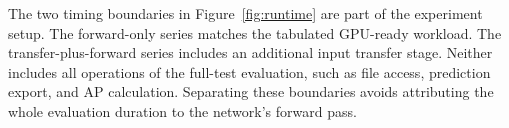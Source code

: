 The two timing boundaries in Figure~\ref{fig:runtime} are part of the
experiment setup. The forward-only series matches the tabulated GPU-ready
workload. The transfer-plus-forward series includes an additional input
transfer stage. Neither includes all operations of the full-test evaluation,
such as file access, prediction export, and AP calculation. Separating
these boundaries avoids attributing the whole evaluation duration to the
network's forward pass.

